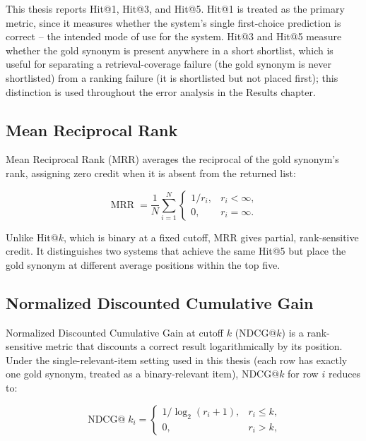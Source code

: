 This thesis reports Hit@1, Hit@3, and Hit@5. Hit@1 is treated as the primary metric, since it measures whether the system's single first-choice prediction is correct -- the intended mode of use for the system. Hit@3 and Hit@5 measure whether the gold synonym is present anywhere in a short shortlist, which is useful for separating a retrieval-coverage failure (the gold synonym is never shortlisted) from a ranking failure (it is shortlisted but not placed first); this distinction is used throughout the error analysis in the Results chapter.

\subsection{Mean Reciprocal Rank}

Mean Reciprocal Rank (MRR) averages the reciprocal of the gold synonym's rank, assigning zero credit when it is absent from the returned list:

\begin{equation}
\operatorname{MRR} = \frac{1}{N} \sum_{i=1}^{N}
\begin{cases}
1/r_i, & r_i < \infty,\\
0, & r_i = \infty.
\end{cases}
\label{eq:mrr}
\end{equation}

Unlike Hit@$k$, which is binary at a fixed cutoff, MRR gives partial, rank-sensitive credit. It distinguishes two systems that achieve the same Hit@5 but place the gold synonym at different average positions within the top five.

\subsection{Normalized Discounted Cumulative Gain}

Normalized Discounted Cumulative Gain at cutoff $k$ (NDCG@$k$) is a rank-sensitive metric that discounts a correct result logarithmically by its position. Under the single-relevant-item setting used in this thesis (each row has exactly one gold synonym, treated as a binary-relevant item), NDCG@$k$ for row $i$ reduces to:

\begin{equation}
\operatorname{NDCG@}k_i =
\begin{cases}
1/\log_2(r_i+1), & r_i \leq k,\\
0, & r_i > k,
\end{cases}
\label{eq:ndcg-at-k}
\end{equation}

